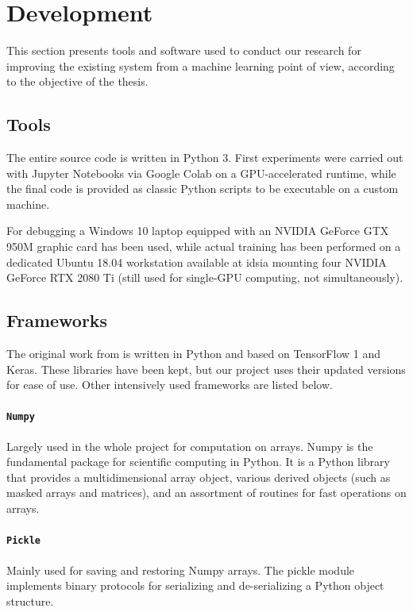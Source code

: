 \section{Development}
\label{sec:software}

This section presents tools and software used to conduct our research for improving the existing system from a machine learning point of view, according to the objective of the thesis.



\subsection{Tools}
\label{subsec:tools}

The entire source code is written in Python 3. First experiments were carried out with Jupyter Notebooks via Google Colab on a GPU-accelerated runtime, while the final code is provided as classic Python scripts to be executable on a custom machine.

For debugging a Windows 10 laptop equipped with an NVIDIA GeForce GTX 950M graphic card has been used, while actual training has been performed on a dedicated Ubuntu 18.04 workstation available at \gls{idsia} mounting four NVIDIA GeForce RTX 2080 Ti (still used for single-GPU computing, not simultaneously).



\subsection{Frameworks}
\label{subsec:frameworks}

The original work from \cite{mantegazza2019visionbased} is written in Python and based on TensorFlow 1 and Keras. These libraries have been kept, but our project uses their updated versions for ease of use. Other intensively used frameworks are listed below.


\paragraph*{\texttt{Numpy}}
Largely used in the whole project for computation on arrays. Numpy is the fundamental package for scientific computing in Python. It is a Python library that provides a multidimensional array object, various derived objects (such as masked arrays and matrices), and an assortment of routines for fast operations on arrays. 

\paragraph*{\texttt{Pickle}}
Mainly used for saving and restoring Numpy arrays. The pickle module implements binary protocols for serializing and de-serializing a Python object structure. 

